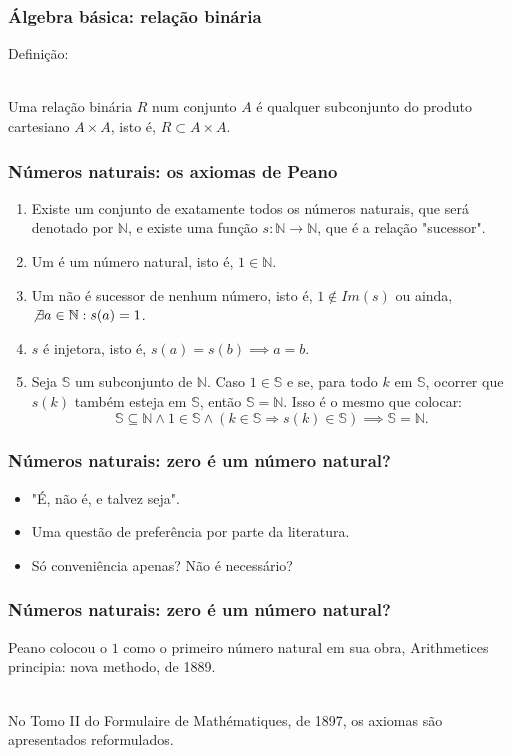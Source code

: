 \documentclass[xcolor=dvipsnames]{beamer}
\begin{document}
\begin{frame}
\frametitle{Álgebra básica: relação binária}
    Definição: \\~\
    
    Uma relação binária $R$ num conjunto $A$ é qualquer subconjunto do produto cartesiano $A \times A$, isto é, $R \subset A \times A$.
\end{frame}


\begin{frame}
\frametitle{Números naturais: os axiomas de Peano}
\begin{enumerate}
    \item Existe um conjunto de exatamente todos os números naturais, que será denotado por $\mathbb{N}$, e existe uma função $s: \mathbb{N} \rightarrow \mathbb{N}$, que é a relação "sucessor". 
    \item Um é um número natural, isto é, $1 \in \mathbb{N}$.
    \item Um não é sucessor de nenhum número, isto é, $1 \not \in Im(s)$ ou ainda, $\not \exists a \in \mathbb{N} : s(a) = 1$.
    \item  $s$ é injetora, isto é, $s(a) = s(b) \implies a = b$.
    \item Seja $\mathbb{S}$ um subconjunto de $\mathbb{N}$. Caso $1 \in \mathbb{S}$ e se, para todo $k$ em $\mathbb{S}$, ocorrer que $s(k)$ também esteja em $\mathbb{S}$, então $\mathbb{S} = \mathbb{N}$. Isso é o mesmo que colocar: \\
     \[ \mathbb{S} \subseteq \mathbb{N} \land 1 \in \mathbb{S} \land ( k \in \mathbb{S} \Rightarrow s(k) \in \mathbb{S}) \implies \mathbb{S} = \mathbb{N} .\]
\end{enumerate}

\end{frame}

\begin{frame}
\frametitle{Números naturais: zero é um número natural?}
    \begin{itemize}
        \item "É, não é, e talvez seja".
        \item Uma questão de preferência por parte da literatura.
        \item Só conveniência apenas? Não é necessário?
    \end{itemize}
\end{frame}

\begin{frame}
\frametitle{Números naturais: zero é um número natural?}
    Peano colocou o $1$ como o primeiro número natural em sua obra, Arithmetices principia: nova methodo, de 1889.\\~\

    No Tomo II do Formulaire de Mathématiques, de 1897, os axiomas são apresentados reformulados.
\end{frame}
\end{document}
